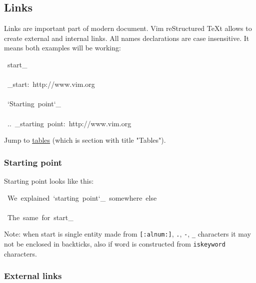 \documentclass[12pt]{article}
\begin{document}
\hypertarget{llinks}{}
\subsection{Links}

Links are important part of modern document. Vim reStructured \TeX{}t allows to create
external and internal links. All names declarations are case
insensitive. It means both examples will be working:

\begin{ttfamily}\begin{flushleft}
\mbox{~start\_}\\
\mbox{}\\
\mbox{~\_start:~http://www.vim.org}\\
\mbox{}\\
\mbox{~`Starting~point`\_}\\
\mbox{}\\
\mbox{~..~\_starting~point:~http://www.vim.org}\\
\end{flushleft}\end{ttfamily}

Jump to \href{\#ltables}{tables} (which is section with title "Tables").

\hypertarget{lstarting-point}{}
\subsubsection{Starting point}

Starting point looks like this:

\begin{ttfamily}\begin{flushleft}
\mbox{~We~explained~`starting~point`\_~somewhere~else}\\
\mbox{}\\
\mbox{~The~same~for~start\_}\\
\end{flushleft}\end{ttfamily}

Note: when start is single entity made from \texttt{[:alnum:]}, \texttt{.}, \texttt{-},
\texttt{\_} characters it may not be enclosed in backticks, also if word
is constructed from \texttt{iskeyword} characters.

\hypertarget{lexternal-links}{}
\subsubsection{External links}
\end{document}
